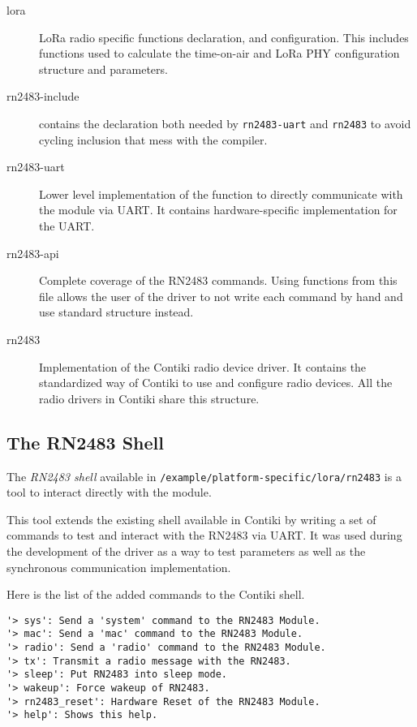 \begin{description}
  \item[lora] LoRa radio specific functions declaration, and configuration.
    This includes functions used to calculate the time-on-air and
    LoRa PHY configuration structure and parameters.
  \item[rn2483-include] contains the declaration both needed by
    \lstinline{rn2483-uart} and \lstinline{rn2483} to avoid cycling inclusion
    that mess with the compiler.
  \item[rn2483-uart] Lower level implementation of the function to directly
    communicate with the module via UART\@.
    It contains hardware-specific implementation for the UART\@.
  \item[rn2483-api] Complete coverage of the RN2483 commands. Using functions
    from this file allows the user of the driver to not write
    each command by hand and use standard structure instead.
  \item[rn2483] Implementation of the Contiki radio device driver.
    It contains the standardized way of Contiki to use and configure radio
    devices.
    All the radio drivers in Contiki share this structure.
\end{description}

\subsection{The RN2483 Shell\label{appendix:shell}}

The \emph{RN2483 shell} available in
\lstinline{/example/platform-specific/lora/rn2483}
is a tool to interact directly with the module.

This tool extends the existing shell available in Contiki by writing a set
of commands to test and interact with the RN2483 via UART\@.
It was used during the development of the driver as a way to test parameters
as well as the synchronous communication implementation.

Here is the list of the added commands to the Contiki shell.

\begin{lstlisting}[language=none]
'> sys': Send a 'system' command to the RN2483 Module.
'> mac': Send a 'mac' command to the RN2483 Module.
'> radio': Send a 'radio' command to the RN2483 Module.
'> tx': Transmit a radio message with the RN2483.
'> sleep': Put RN2483 into sleep mode.
'> wakeup': Force wakeup of RN2483.
'> rn2483_reset': Hardware Reset of the RN2483 Module.
'> help': Shows this help.
\end{lstlisting}

